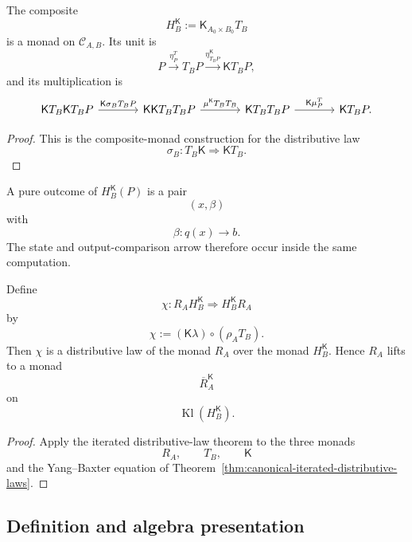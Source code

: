 \begin{proposition}
\label{prop:effectful-output-comparison-monad}
The composite
\[
    H_B^{\mathsf K}
    :=
    \mathsf K_{A_0\times B_0}T_B
\]
is a monad on \(\mathcal C_{A,B}\).  Its unit is
\[
    P
    \xrightarrow{\eta^T_P}
    T_BP
    \xrightarrow{\eta^{\mathsf K}_{T_BP}}
    \mathsf KT_BP,
\]
and its multiplication is
\[
\begin{tikzcd}[column sep=large]
    \mathsf KT_B\mathsf KT_BP
        \arrow[r,"{\mathsf K\sigma_BT_BP}"]
    &
    \mathsf K\mathsf KT_BT_BP
        \arrow[r,"{\mu^{\mathsf K}T_BT_B}"]
    &
    \mathsf KT_BT_BP
        \arrow[r,"{\mathsf K\mu^T_P}"]
    &
    \mathsf KT_BP.
\end{tikzcd}
\]
\end{proposition}

\begin{proof}
This is the composite-monad construction for the distributive law
\[
    \sigma_B:T_B\mathsf K\Rightarrow\mathsf KT_B.
\]
\end{proof}

A pure outcome of \(H_B^{\mathsf K}(P)\) is a pair
\[
    (x,\beta)
\]
with
\[
    \beta:q(x)\to b.
\]
The state and output-comparison arrow therefore occur inside the same
computation.

\begin{proposition}
\label{prop:effectful-input-distributive-law}
Define
\[
    \chi:
    R_AH_B^{\mathsf K}
    \Longrightarrow
    H_B^{\mathsf K}R_A
\]
by
\[
    \chi
    :=
    (\mathsf K\lambda)
    \circ
    (\rho_AT_B).
\]
Then \(\chi\) is a distributive law of the monad \(R_A\) over the monad
\(H_B^{\mathsf K}\).  Hence \(R_A\) lifts to a monad
\[
    \overline R_A^{\mathsf K}
\]
on
\[
    \operatorname{Kl}(H_B^{\mathsf K}).
\]
\end{proposition}

\begin{proof}
Apply the iterated distributive-law theorem to the three monads
\[
    R_A,
    \qquad
    T_B,
    \qquad
    \mathsf K
\]
and the Yang--Baxter equation of
Theorem~\ref{thm:canonical-iterated-distributive-laws}.
\end{proof}

\subsection{Definition and algebra presentation}
\label{subsec:effectful-mealy-definition}

